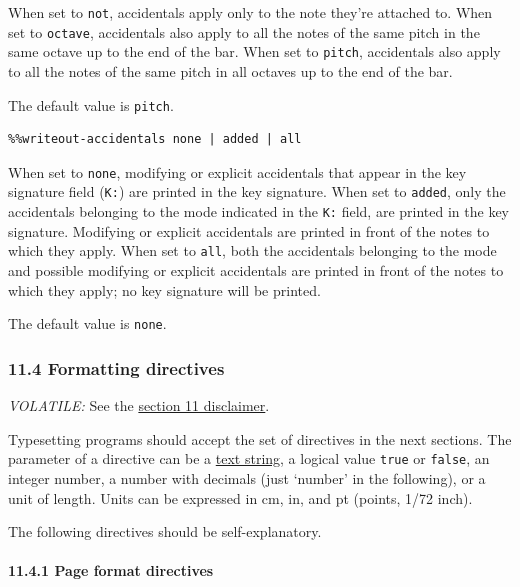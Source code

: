 \documentclass[oneside]{book}
\let\oldparagraph\paragraph
\renewcommand{\paragraph}[1]{\oldparagraph{#1}\mbox{}}
\begin{document}
When set to \texttt{not}, accidentals apply only to the note they're
attached to. When set to \texttt{octave}, accidentals also apply to all
the notes of the same pitch in the same octave up to the end of the bar.
When set to \texttt{pitch}, accidentals also apply to all the notes of
the same pitch in all octaves up to the end of the bar.

The default value is \texttt{pitch}.

\begin{verbatim}
%%writeout-accidentals none | added | all
\end{verbatim}

When set to \texttt{none}, modifying or explicit accidentals that appear
in the key signature field (\texttt{K:}) are printed in the key
signature. When set to \texttt{added}, only the accidentals belonging to
the mode indicated in the \texttt{K:} field, are printed in the key
signature. Modifying or explicit accidentals are printed in front of the
notes to which they apply. When set to \texttt{all}, both the
accidentals belonging to the mode and possible modifying or explicit
accidentals are printed in front of the notes to which they apply; no
key signature will be printed.

The default value is \texttt{none}.

\hypertarget{formatting_directives}{\subsubsection{11.4 Formatting
directives}\label{formatting_directives}}

\emph{VOLATILE:} See the \protect\hyperlink{disclaimer}{section 11
disclaimer}.

Typesetting programs should accept the set of directives in the next
sections. The parameter of a directive can be a
\protect\hyperlink{text_string_definition}{text string}, a logical value
\texttt{true} or \texttt{false}, an integer number, a number with
decimals (just `number' in the following), or a unit of length. Units
can be expressed in cm, in, and pt (points, 1/72 inch).

The following directives should be self-explanatory.

\hypertarget{page_format_directives}{\paragraph{11.4.1 Page format
directives}\label{page_format_directives}}
\end{document}
